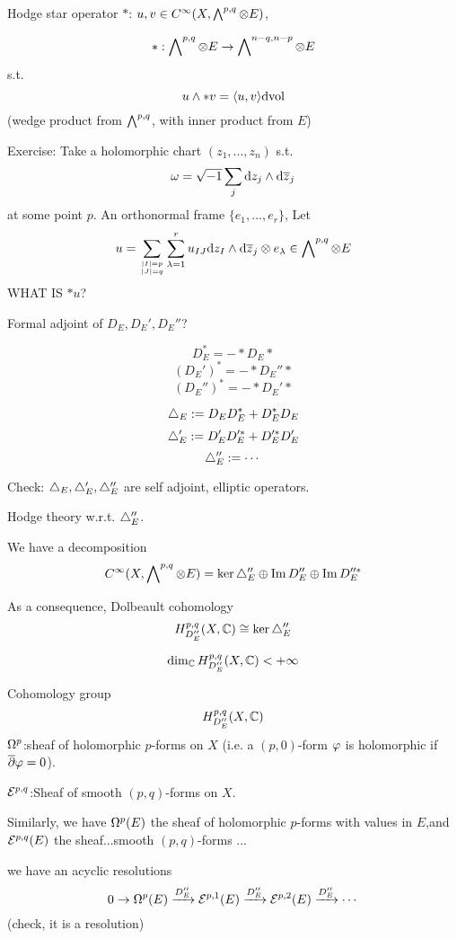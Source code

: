 Hodge star operator $*$:
$u,v\in C^\infty(X,\bigwedge\nolimits^{p,q}\otimes E)$,
\begin{definition}
$$*:\bigwedge\nolimits^{p,q}\otimes E\to\bigwedge\nolimits^{n-q,n-p}\otimes E$$
s.t.
$$u\wedge *v=\langle u,v\rangle\mathrm{d}\text{vol}$$
(wedge product from $\bigwedge\nolimits^{p,q}$, with inner product from $E$)
\end{definition}

Exercise: Take a holomorphic chart $(z_1,...,z_n)$
s.t.
$$\omega=\sqrt{-1}\sum_j \mathrm{d} z_j\wedge\mathrm{d}\overline{z}_j$$
at some point $p$. An orthonormal frame
$\{e_1,...,e_r\}$, Let
$$u=\sum_{|I|=p\atop |J|=q}
\sum_{\lambda=1}^r
u_{IJ}\mathrm{d} z_I\wedge\mathrm{d}\overline{z}_j\otimes e_\lambda\in\bigwedge\nolimits^{p,q}\otimes E$$
WHAT IS $*u$?

Formal adjoint of $D_E,D_E',D_E''$?
\begin{prop}
$$D_E^*=-*D_E*$$
$$(D_E')^*=-*D_E''*$$
$$(D_E'')^*=-*D_E'*$$
\end{prop}

\begin{definition}
$$\triangle_E:=D_ED_E^*+D_E^*D_E$$
$$\triangle_E':=D_E'D_E'^*+D_E'^*D_E'$$
$$\triangle_E'':=\cdots$$
\end{definition}

Check: $\triangle_E,\triangle_E',\triangle_E''$ are self adjoint, elliptic operators.

Hodge theory w.r.t. $\triangle_E''$.

\begin{thm}
We have a decomposition
$$C^\infty(X,\bigwedge\nolimits^{p,q}\otimes E)=
\ker\triangle_E''\oplus\operatorname{Im} D_E''\oplus \operatorname{Im} D_E''^*$$

As a consequence, Dolbeault cohomology
$$H^{p,q}_{D_E''}(X,\mathbb{C})\cong
\ker\triangle_E''$$
\end{thm}

\begin{cor}
$$\dim_{\mathbb{C}}H^{p,q}_{D_E''}(X,\mathbb{C})<+\infty$$
\end{cor}

Cohomology group
$$H^{p,q}_{D_E''}(X,\mathbb{C})$$
$\Omega^p$:sheaf of holomorphic $p$-forms on $X$
(i.e. a $(p,0)$-form $\varphi$ is holomorphic if $\overline{\partial}\varphi=0$).

$\mathcal{E}^{p,q}$:Sheaf of smooth $(p,q)$-forms on $X$.

Similarly, we have $\Omega^p(E)$ the sheaf of holomorphic $p$-forms
with values in $E$,and $\mathcal{E}^{p,q}(E)$ the sheaf...smooth $(p,q)$-forms ...

we have an acyclic resolutions
$$0\to\Omega^p(E)\xrightarrow{D_E''}
\mathcal{E}^{p,1}(E)\xrightarrow{D_E''}
\mathcal{E}^{p,2}(E)\xrightarrow{D_E''}\cdots$$
(check, it is a resolution)

